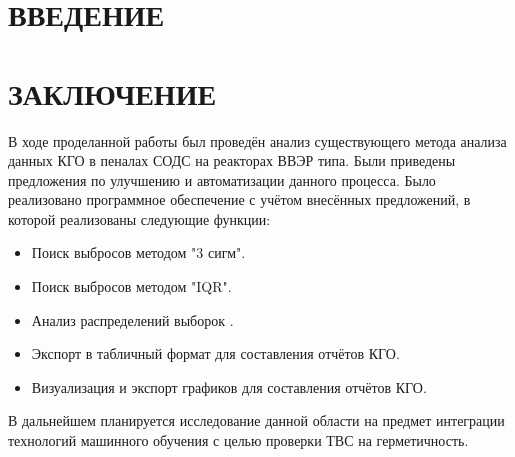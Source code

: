\documentclass[a4paper,12pt]{article}
\begin{document}
\section*{\centering ВВЕДЕНИЕ}
\pagebreak

%
\pagebreak
\pagebreak
\pagebreak
\pagebreak
\pagebreak




\section*{\centering ЗАКЛЮЧЕНИЕ}

В ходе проделанной работы был проведён анализ существующего метода анализа данных КГО в пеналах СОДС на реакторах ВВЭР типа. Были приведены предложения по улучшению и автоматизации данного процесса. Было реализовано программное обеспечение с учётом внесённых предложений, в которой реализованы следующие функции:

\begin{itemize}
\item Поиск выбросов методом "3 сигм".
\item Поиск выбросов методом "IQR".
\item Анализ распределений выборок .
\item Экспорт в табличный формат для составления отчётов КГО.
\item Визуализация и экспорт графиков для составления отчётов КГО.
\end{itemize}

В дальнейшем планируется исследование данной области на предмет интеграции технологий машинного обучения с целью проверки ТВС на герметичность.

\pagebreak

\printbibliography
\end{document}
